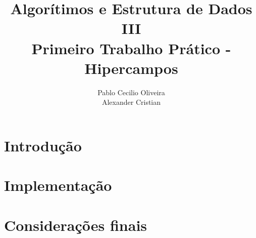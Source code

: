 \documentclass[12pt,a4paper]{article}
\author{Pablo Cecilio Oliveira\\
	Alexander Cristian}
\title{Algorítimos e Estrutura de Dados III\\
	Primeiro Trabalho Prático - Hipercampos}
\date{}
\begin{document}
\maketitle

\section{Introdução}

\section{Implementação}

\section{Considerações finais}

\begin{flushleft}
	\nocite{*}
	
\end{flushleft}
\end{document}
